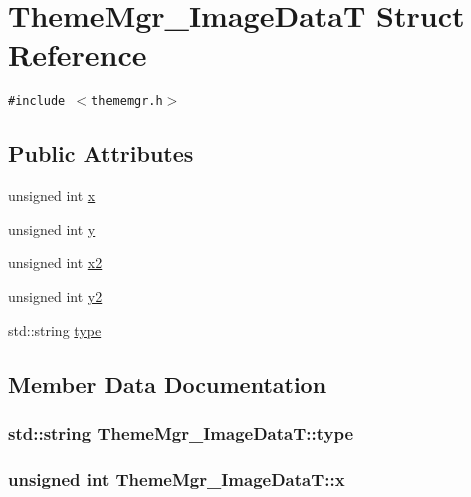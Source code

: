 \hypertarget{struct_theme_mgr___image_data_t}{
\section{ThemeMgr\_\-ImageDataT Struct Reference}
\label{struct_theme_mgr___image_data_t}
}
{\tt \#include $<$thememgr.h$>$}

\subsection*{Public Attributes}
\begin{CompactItemize}
\item 
unsigned int \hyperlink{struct_theme_mgr___image_data_t_349362bd00672825b065b302eda70a4b}{x}
\item 
unsigned int \hyperlink{struct_theme_mgr___image_data_t_e202cf2ccc682085965dd85e4e0aa1da}{y}
\item 
unsigned int \hyperlink{struct_theme_mgr___image_data_t_d850c8ebc01552ae58d1b2799f424c4d}{x2}
\item 
unsigned int \hyperlink{struct_theme_mgr___image_data_t_c6e97b3272a3769f14460771df93c14e}{y2}
\item 
std::string \hyperlink{struct_theme_mgr___image_data_t_9b6a4ecf540006351a22b2993d044f51}{type}
\end{CompactItemize}


\subsection{Member Data Documentation}
\hypertarget{struct_theme_mgr___image_data_t_9b6a4ecf540006351a22b2993d044f51}{
\subsubsection[{type}]{\setlength{\rightskip}{0pt plus 5cm}std::string {\bf ThemeMgr\_\-ImageDataT::type}}}
\label{struct_theme_mgr___image_data_t_9b6a4ecf540006351a22b2993d044f51}


\hypertarget{struct_theme_mgr___image_data_t_349362bd00672825b065b302eda70a4b}{
\subsubsection[{x}]{\setlength{\rightskip}{0pt plus 5cm}unsigned int {\bf ThemeMgr\_\-ImageDataT::x}}}
\label{struct_theme_mgr___image_data_t_349362bd00672825b065b302eda70a4b}


